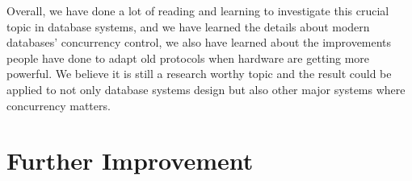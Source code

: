 Overall, we have done a lot of reading and learning to investigate this crucial topic in database systems, and we have learned the details about modern databases' concurrency control, we also have learned about the improvements people have done to adapt old protocols when hardware are getting more powerful. We believe it is still a research worthy topic and the result could be applied to not only database systems design but also other major systems where concurrency matters.

\section{Further Improvement}





